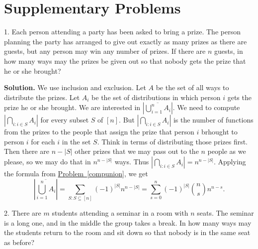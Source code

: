 \documentclass[10pt,]{book}
\theoremstyle{plain}
\theoremstyle{definition}
\theoremstyle{definition}
\numberwithin{equation}{chapter}
\begin{document}
\typeout{************************************************}
\typeout{************************************************}
\section[{Supplementary Problems}]{Supplementary Problems}\label{sec_inclexcl-suppprobs}
\begin{exerciselist}
\item[1.]\hypertarget{exercise-46}{}Each person attending a party has been asked to bring a prize. The person planning the party has arranged to give out exactly as many prizes as there are guests, but any person may win any number of prizes. If there are \(n\) guests, in how many ways may the prizes be given out so that nobody gets the prize that he or she brought?%
\par\smallskip
\par\smallskip
\noindent\textbf{Solution.}\hypertarget{solution-403}{}\quad
We use inclusion and exclusion. Let \(A\) be the set of all ways to distribute the prizes. Let \(A_i\) be the set of distributions in which person \(i\) gets the prize he or she brought. We are interested in \(\left|\overline{\bigcup_{i=1}^n A_i}\right|\). We need to compute \(\left|\bigcap_{i\colon i\in S} A_i\right|\) for every subset \(S\) of \([n]\). But \(\left|\bigcap_{i\colon i\in S} A_i\right|\) is the number of functions from the prizes to the people that assign the prize that person \(i\) brhought to person \(i\) for each \(i\) in the set \(S\). Think in terms of distributing those prizes first. Then there are \(n-|S|\) other prizes that we may pass out to the \(n\) people as we please, so we may do that in \(n^{n-|S|}\) ways. Thus \(\left|\bigcap_{i\colon i\in S} A_i\right|=n^{n-|S|}\). Applying the formula from \hyperref[compunion]{Problem~\ref{compunion}}, we get%
\begin{equation*}
\left|\overline{\bigcup_{i=1}^n A_i}\right| =\sum_{S:S\subseteq [n]}(-1)^{|S|} n^{n-|S|} =
\sum_{s=0}^n (-1)^{|S|}\binom{n}{s}n^{n-s}.
\end{equation*}
%
\item[2.]\hypertarget{exercise-47}{}There are \(m\) students attending a seminar in a room with \(n\) seats. The seminar is a long one, and in the middle the group takes a break. In how many ways may the students return to the room and sit down so that nobody is in the same seat as before?%
\par\smallskip
\par\smallskip

\end{exerciselist}
\end{document}
